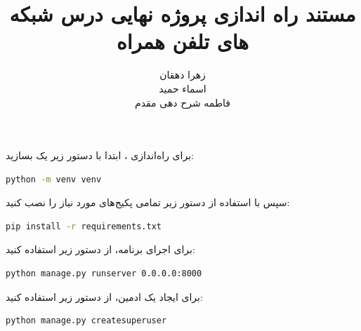 \documentclass{report}
\title{مستند راه اندازی پروژه نهایی درس شبکه های تلفن همراه}
\author{زهرا دهقان\\اسماء حمید\\فاطمه شرح دهی مقدم}
\begin{document}
\Godpage
\maketitle
{}
\tableofcontents


\chapter{}

برای راه‌اندازی ، ابتدا با دستور زیر یک  بسازید:

\begin{lstlisting}[language=bash]
python -m venv venv
\end{lstlisting}

سپس با استفاده از دستور زیر تمامی پکیج‌های مورد نیاز را نصب کنید:

\begin{lstlisting}[language=bash]
pip install -r requirements.txt
\end{lstlisting}

برای اجرای برنامه، از دستور زیر استفاده کنید:

\begin{lstlisting}[language=bash]
python manage.py runserver 0.0.0.0:8000
\end{lstlisting}

برای ایجاد یک ادمین، از دستور زیر استفاده کنید:

\begin{lstlisting}[language=bash]
python manage.py createsuperuser
\end{lstlisting}


\chapter{ }
\end{document}
